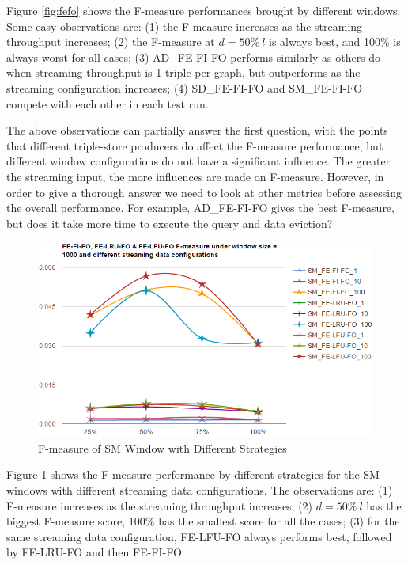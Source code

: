 Figure \ref{fig:fefo} shows the F-measure performances brought by different windows. 
Some easy observations are: 
(1) the F-measure increases as the streaming throughput increases;
(2) the F-measure at $d = 50\%\ l$ is always best, and 100\% is always worst for all cases;
(3) AD\_FE-FI-FO performs similarly as others do when streaming throughput is 1 triple per graph, but outperforms as the streaming configuration increases;
(4) SD\_FE-FI-FO and SM\_FE-FI-FO compete with each other in each test run.

The above observations can partially answer the first question, with the points that different triple-store producers do affect the F-measure performance, but different window configurations do not have a significant influence. 
The greater the streaming input, the more influences are made on F-measure. 
However, in order to give a thorough answer we need to look at other metrics before assessing the overall performance. 
For example, AD\_FE-FI-FO gives the best F-measure, but does it take more time to execute the query and data eviction?

\begin{figure}[!htbp]
	\centering
	\includegraphics[width=5in]{img/4-fds.png}
	\caption{F-measure of SM Window with Different Strategies}
	\label{fig:diff}
\end{figure}

Figure \ref{fig:diff} shows the F-measure performance by different strategies for the SM windows with different streaming data configurations. 
The observations are: 
(1) F-measure increases as the streaming throughput increases;
(2) $d = 50\%\ l$ has the biggest F-measure score, 100\% has the smallest score for all the cases;
(3) for the same streaming data configuration, FE-LFU-FO always performs best, followed by FE-LRU-FO and then FE-FI-FO.

